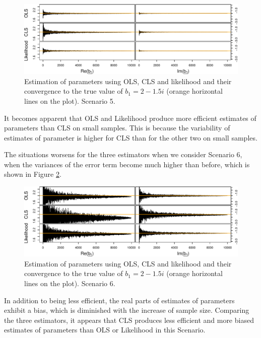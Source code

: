 \documentclass[
]{book}
\begin{document}
\begin{figure}
\centering
\includegraphics{Svetunkov---Svetunkov---Complex-Dynamic-Models_files/figure-latex/parametersCorError-1.pdf}
\caption{\label{fig:parametersCorError}Estimation of parameters using OLS, CLS and likelihood and their convergence to the true value of \(b_1=2-1.5i\) (orange horizontal lines on the plot). Scenario 5.}
\end{figure}

It becomes apparent that OLS and Likelihood produce more efficient estimates of parameters than CLS on small samples. This is because the variability of estimates of parameter is higher for CLS than for the other two on small samples.

The situations worsens for the three estimators when we consider Scenario 6, when the variances of the error term become much higher than before, which is shown in Figure \ref{fig:parametersHVError}.

\begin{figure}
\centering
\includegraphics{Svetunkov---Svetunkov---Complex-Dynamic-Models_files/figure-latex/parametersHVError-1.pdf}
\caption{\label{fig:parametersHVError}Estimation of parameters using OLS, CLS and likelihood and their convergence to the true value of \(b_1=2-1.5i\) (orange horizontal lines on the plot). Scenario 6.}
\end{figure}

In addition to being less efficient, the real parts of estimates of parameters exhibit a bias, which is diminished with the increase of sample size. Comparing the three estimators, it appears that CLS produces less efficient and more biased estimates of parameters than OLS or Likelihood in this Scenario.
\end{document}

